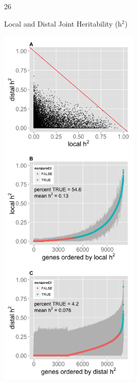 \documentclass[final]{beamer}
\newcommand{\ColWidth}{26}
\begin{document}
\begin{frame}{}
\begin{textblock}{\ColWidth}
\begin{block}{Local and Distal Joint Heritability (h$^2$)}
	\begin{center}
		\includegraphics[width=0.5\textwidth]{plots/Fig1.png}

\end{center}
\end{block}
\end{textblock}
\end{frame}
\end{document}
